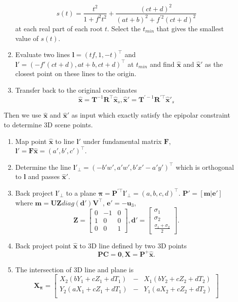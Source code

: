\documentclass{../../assignment}
\begin{document}
\begin{problemlist}
\begin{enumerate}
\begin{enumerate}
$$
s(t) = \frac{t^2}{1+f^2t^2} + \frac{(ct+d)^2}{(at+b)^2+f^{'2}(ct+d)^2}
$$
at each real part of each root $t$. Select the $t_{min}$ that gives the smallest value of $s(t)$.
\item Evaluate two lines $\mathbf{l} = (tf,1,-t)^{\top}$ and $\mathbf{l}' = (-f'(ct+d), at+b, ct+d)^{\top}$ at $t_{min}$ and find $\hat{\mathbf{x}}$ and $\hat{\mathbf{x}}'$ as the closest point on these lines to the origin.
\item Transfer back to the original coordinates
$$
\hat{\mathbf{x}} = \mathbf{T}^{-1}\mathbf{R}^{\top}\hat{\mathbf{x}}_s,
\hat{\mathbf{x}}' = \mathbf{T}^{'-1}\mathbf{R}^{'\top}\hat{\mathbf{x}}'_s
$$
\end{enumerate}
Then we use $\hat{\mathbf{x}}$ and $\hat{\mathbf{x}}'$ as input which exactly satisfy the epipolar constraint to determine 3D scene points.
\begin{enumerate}
\item Map point $\hat{\mathbf{x}}$ to line $\mathbf{l}'$ under fundamental matrix $\mathbf{F}$, $\mathbf{l}' = \mathbf{F\hat{x}} = (a',b',c')^{\top}$.
\item Determine the line $\mathbf{l}'_{\bot} = (-b'w',a'w',b'x'-a'y')^{\top}$ which is orthogonal to $\mathbf{l}$ and passes $\hat{\mathbf{x}}'$.
\item Back project $\mathbf{l}'_{\bot}$ to a plane $\mathbf{\pi} = \mathbf{P}^{'\top}\mathbf{l}'_{\bot} = (a,b,c,d)^{\top}$. $\mathbf{P}' = [\mathbf{m}|\mathbf{e}']$ where $\mathbf{m} = \mathbf{UZ}diag(\mathbf{d}')\mathbf{V}^{\top}$, $\mathbf{e}' = -\mathbf{u}_3$,
$$
\mathbf{Z} = 
\begin{bmatrix}
0 & -1 & 0\\
1 & 0 & 0\\
0 & 0 & 1
\end{bmatrix},
\mathbf{d}' = 
\begin{bmatrix}
\sigma_1\\
\sigma_2\\
\frac{\sigma_1 + \sigma_2}{2}
\end{bmatrix}.
$$
\item Back project point $\hat{\mathbf{x}}$ to 3D line defined by two 3D points
$$
\mathbf{PC} = \mathbf{0}, \mathbf{X} = \mathbf{P}^+\hat{\mathbf{x}}.
$$
\item The intersection of 3D line and plane is
$$
\mathbf{X_{\pi}} = 
\begin{bmatrix}
X_2(bY_1+cZ_1+dT_1) & - &  X_1(bY_2+cZ_2+dT_2)\\
Y_2(aX_1+cZ_1+dT_1) & - & Y_1(aX_2+cZ_2+dT_2)\\

\end{bmatrix}$$
\end{enumerate}
\end{enumerate}
\end{problemlist}
\end{document}
